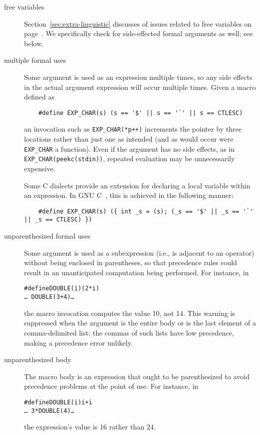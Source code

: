 \documentclass[10pt]{article}
\begin{document}
\begin{description}
\item[free variables]
  Section~\ref{sec:extra-linguistic} discusses of issues related to free
  variables on page~\pageref{page:freevar}.  We specifically check for
  side-effected formal arguments as well; see below.

\item[multiple formal uses]
  Some argument is used as an expression multiple times, so any side
  effects in the actual argument expression will occur multiple times.
  Given a macro defined as
\begin{verbatim}
    #define EXP_CHAR(s) (s == '$' || s == '`' || s == CTLESC)
\end{verbatim}
  an invocation such as {\tt \verb|EXP_CHAR|(*p++)} increments the pointer
  by three locations rather than just one as intended (and as would occur
  were \verb|EXP_CHAR| a function).  Even if the argument has no side
  effects, as in {\tt \verb|EXP_CHAR|(peekc(stdin))}, repeated evaluation may be
  unnecessarily expensive.
        
  Some C dialects provide an extension for declaring a local variable
  within an expression.  In GNU C~\cite{GCC}, this is achieved in the
  following manner:
\begin{verbatim}
    #define EXP_CHAR(s) ({ int _s = (s); (_s == '$' || _s == '`' || _s == CTLESC) })
\end{verbatim}

\item[unparenthesized formal uses]
        Some argument is used as a subexpression (i.e., is adjacent to an
        operator) without being enclosed in parentheses, so that precedence
        rules could result in an unanticipated computation being performed.
        For instance, in
\begin{alltt}
    #define DOUBLE(i) (2*i)
    \ldots\ DOUBLE(3+4) \ldots
\end{alltt}
        the macro invocation computes the value 10, not 14.
        This warning is suppressed when the argument is the entire body
        or is the last element of a comma-delimited list:  the commas of
        such lists have low precedence, making a precedence error unlikely.

\item[unparenthesized body]
        The macro body is an expression that ought to be parenthesized to
        avoid precedence problems at the point of use.  For instance, in
\begin{alltt}
    #define DOUBLE(i) i+i
    \ldots\ 3*DOUBLE(4) \ldots
\end{alltt}
        the expression's value is 16 rather than 24.
        

\end{description}
\end{document}
